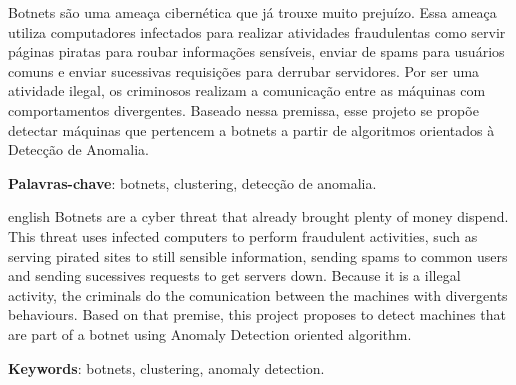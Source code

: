 \begin{resumo}
	Botnets são uma ameaça cibernética que já trouxe muito prejuízo\cite{silva2013botnets}. Essa ameaça utiliza computadores infectados para realizar atividades fraudulentas como servir páginas piratas para roubar informações sensíveis, enviar de spams para usuários comuns e enviar sucessivas requisições para derrubar servidores. Por ser uma atividade ilegal, os criminosos realizam a comunicação entre as máquinas com comportamentos divergentes.
	Baseado nessa premissa, esse projeto se propõe detectar máquinas que pertencem a botnets a partir de algoritmos orientados à Detecção de Anomalia.

	\vspace{\onelineskip}
	\noindent
	\textbf{Palavras-chave}: botnets, clustering, detecção de anomalia.
\end{resumo}

\begin{resumo}[Abstract]
	\begin{otherlanguage*}{english}
		Botnets are a cyber threat that already brought plenty of money dispend\cite{silva2013botnets}. This threat uses infected computers to perform fraudulent activities, such as serving pirated sites to still sensible information, sending spams to common users and sending sucessives requests to get servers down. Because it is a illegal activity, the criminals do the comunication between the machines with divergents behaviours.
		Based on that premise, this project proposes to detect machines that are part of a botnet using Anomaly Detection oriented algorithm.

		\vspace{\onelineskip}
		\noindent
		\textbf{Keywords}: botnets, clustering, anomaly detection.
	\end{otherlanguage*}
\end{resumo}